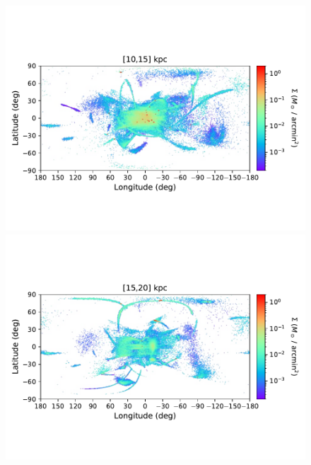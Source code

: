 \begin{figure}[h!]
\begin{center}
            \includegraphics[clip=true, trim = 0mm 20mm 0mm 20mm, width=0.9\columnwidth]{images/PII_ensemble_LB_D10-15_mass_est_new.pdf}
            \includegraphics[clip=true, trim = 0mm 20mm 0mm 20mm, width=0.9\columnwidth]{images/PII_ensemble_LB_D15-20_mass_est_new.pdf}


\end{center}
\end{figure}
